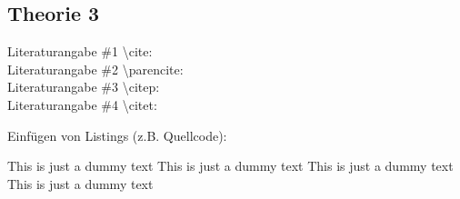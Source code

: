\subsection{Theorie 3}
\label{sec:theorieC}

Literaturangabe \#1 \textbackslash cite: \cite{max2007company} \\
Literaturangabe \#2 \textbackslash parencite: \parencite{example2017sdk} \\
Literaturangabe \#3 \textbackslash citep: \citep{place2014art} \\
Literaturangabe \#4 \textbackslash citet: \citet{max2007company}

\bigskip

Einfügen von Listings (z.B. Quellcode):

\begin{center}
	\begin{minipage}[!h]{\textwidth}
		
	\end{minipage}
\end{center}
\bigskip

This is just a dummy text This is just a dummy text This is just a dummy text This is just a dummy text